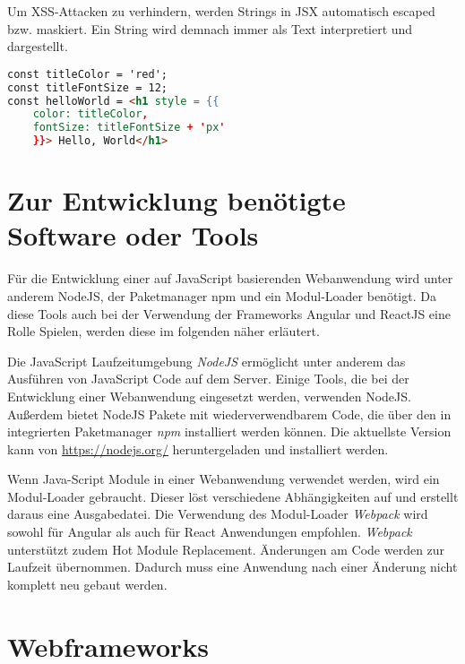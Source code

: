 Um XSS-Attacken zu verhindern, werden Strings in JSX automatisch escaped bzw. maskiert. Ein String wird demnach immer als Text interpretiert und dargestellt.\autocites[vgl.][59\psqq]{Zeigermann.2016}[vgl.][65\psqq]{Stefanov.2017} 

\begin{lstlisting}[caption=Beispiel für die Verwendung von JSX, label=lst:JSXBeispiel, language=HTML]
const titleColor = 'red';
const titleFontSize = 12;
const helloWorld = <h1 style = {{
	color: titleColor,
	fontSize: titleFontSize + 'px'
	}}> Hello, World</h1>
\end{lstlisting}



\section{Zur Entwicklung benötigte Software oder Tools}
Für die Entwicklung einer auf JavaScript basierenden Webanwendung wird unter anderem NodeJS, der Paketmanager npm und ein Modul-Loader benötigt. Da diese Tools auch bei der Verwendung der Frameworks Angular und ReactJS eine Rolle Spielen, werden diese  im folgenden näher erläutert.


\label{NodeJS}
Die JavaScript Laufzeitumgebung \textit{NodeJS} ermöglicht unter anderem das Ausführen von JavaScript Code auf dem Server. Einige Tools, die bei der Entwicklung einer Webanwendung eingesetzt werden, verwenden NodeJS. Außerdem bietet NodeJS Pakete mit wiederverwendbarem Code, die über den in integrierten Paketmanager \textit{npm} installiert werden können. Die aktuellste Version kann von \url{https://nodejs.org/} heruntergeladen und installiert werden.  \autocites[vgl.][1\psqq]{Steyer.2017}[vgl.][7\psqq]{Freeman.2018}[vgl.][6\psqq]{Woiwode.2018} 

\label{Webpack}
Wenn Java-Script Module in einer Webanwendung verwendet werden, wird ein Modul-Loader gebraucht. Dieser löst verschiedene Abhängigkeiten auf und erstellt daraus eine Ausgabedatei. Die Verwendung des Modul-Loader \textit{Webpack} wird sowohl für Angular als auch für React Anwendungen empfohlen. \textit{Webpack} unterstützt zudem Hot Module Replacement. Änderungen am Code werden zur Laufzeit übernommen. Dadurch muss eine Anwendung nach einer Änderung nicht komplett neu gebaut werden.\autocites[vgl.][13,21]{Woiwode.2018}[vgl.][9,295-301]{Zeigermann.2016}[vgl.][]{Hlushko.2018}


\section{Webframeworks}

